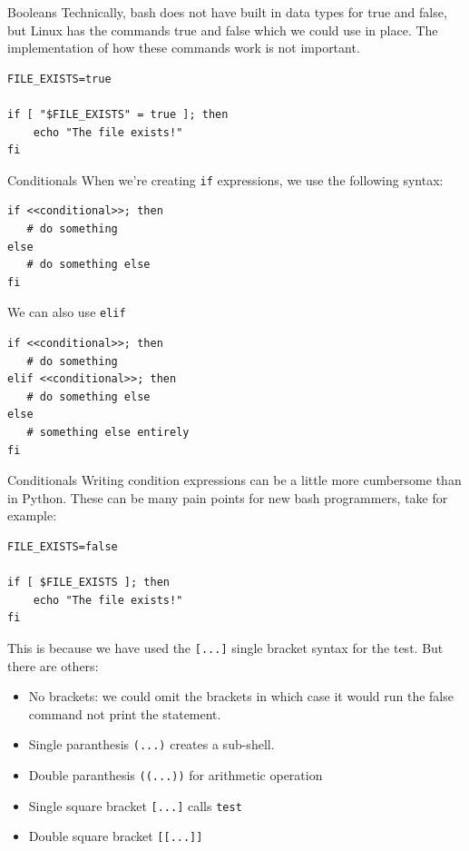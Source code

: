 \documentclass[10pt]{beamer}
\begin{document}
\begin{frame}[label={sec:org52492fb},fragile]{Booleans}
 Technically, bash does not have built in data types for true and false, but
Linux has the commands true and false which we could use in place. The
implementation of how these commands work is not important.

\begin{verbatim}
FILE_EXISTS=true

if [ "$FILE_EXISTS" = true ]; then
    echo "The file exists!"
fi
\end{verbatim}
\end{frame}


\begin{frame}[label={sec:org18d0763},fragile]{Conditionals}
 When we're creating \texttt{if} expressions, we use the following syntax:

\begin{verbatim}
if <<conditional>>; then
   # do something
else
   # do something else
fi
\end{verbatim}

We can also use \texttt{elif}

\begin{verbatim}
if <<conditional>>; then
   # do something
elif <<conditional>>; then
   # do something else
else
   # something else entirely
fi
\end{verbatim}
\end{frame}

\begin{frame}[label={sec:org9017c7f},fragile]{Conditionals}
 Writing condition expressions can be a little more cumbersome than in
Python. These can be many pain points for new bash programmers, take for
example:

\begin{verbatim}
FILE_EXISTS=false

if [ $FILE_EXISTS ]; then
    echo "The file exists!"
fi
\end{verbatim}

This is because we have used the \texttt{[...]} single bracket syntax for the test. But
there are others:

\begin{itemize}
\item No brackets: we could omit the brackets in which case it would run the false
command not print the statement.
\item Single paranthesis \texttt{(...)} creates a sub-shell.
\item Double paranthesis \texttt{((...))} for arithmetic operation
\item Single square bracket \texttt{[...]} calls \texttt{test}
\item Double square bracket \texttt{[[...]]}
\end{itemize}
\end{frame}
\end{document}

